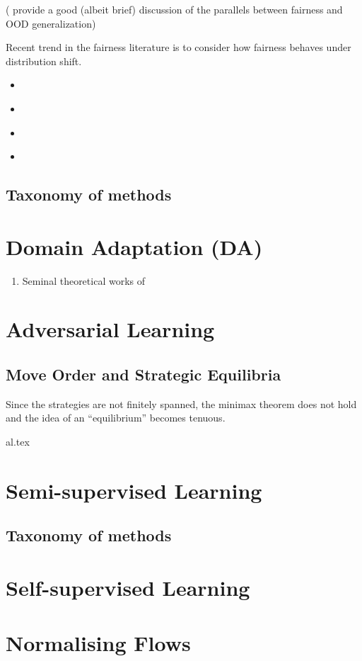 (\citep{krueger2021out} provide a good (albeit brief) discussion of the parallels between fairness and OOD
generalization)

Recent trend in the fairness literature is to consider how fairness behaves under distribution
shift.
\begin{itemize}
  \item \cite{schrouff2022diagnosing}
  \item \cite{schrouff2022maintaining}
  \item \cite{singh2021fairness}
  \item \cite{slack2020fairness}

\end{itemize}

\subsection{Taxonomy of methods}

\section{Domain Adaptation (DA)}
\begin{enumerate}
  \item Seminal theoretical works of \cite{ben2006analysis, ben2010theory}
\end{enumerate}

\section{Adversarial Learning}
\cite{GooAbaMirXuetal14}
\subsection{Move Order and Strategic Equilibria} Since the strategies are not finitely spanned, the
minimax theorem does not hold and the idea of an ``equilibrium'' becomes tenuous.

{al.tex}


\section{ Semi-supervised Learning }\label{sec:SemiSL}
\subsection{Taxonomy of methods}

\section{ Self-supervised Learning }\label{sec:SelfSL}

\section{ Normalising Flows }\label{sec:nfs}

